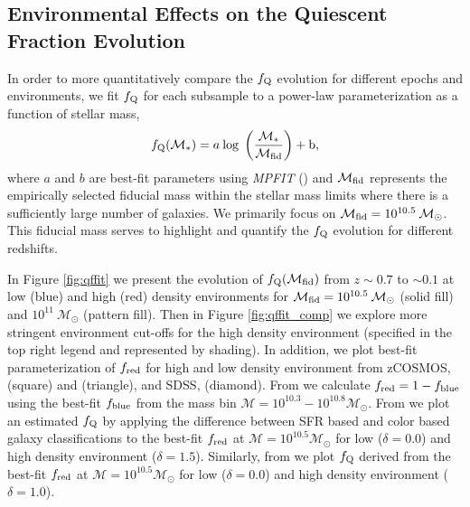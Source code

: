 \documentclass{emulateapj}
\begin{document}
\subsection{Environmental Effects on the Quiescent Fraction Evolution} \label{sec:env_qf_evol}
In order to more quantitatively compare the $f_{\rm{Q}}$ evolution for different epochs and environments, we fit $f_{\rm{Q}}$ for each subsample to a power-law parameterization as a function of stellar mass, 
\begin{equation} \label{eq:qffit}
f_{\rm{Q}}(\mathcal{M}_{*}) = a \: \rm{log} \; \left(\frac{ \mathcal{M}_{*}}{\mathcal{M}_{\rm{fid}}} \right)+b,
\end{equation}
where $a$ and $b$ are best-fit parameters using {\em MPFIT} (\cite{Markwardt:2009aa}) and $\mathcal{M}_{\rm{fid}}$ represents the empirically selected fiducial mass within the stellar mass limits where there is a sufficiently large number of galaxies. We primarily focus on $\mathcal{M}_{\rm{fid}} = 10^{10.5} \: \mathcal{M}_{\odot}$. This fiducial mass serves to highlight and quantify the $f_{\rm{Q}}$ evolution for different redshifts. 

In Figure \ref{fig:qffit} we present the evolution of $f_{\rm{Q}}(\mathcal{M}_{\rm{fid}})$ from $z \sim 0.7$ to $\sim 0.1$ at low (blue) and high (red) density environments for $\mathcal{M}_{\rm{fid}} = 10^{10.5} \: \mathcal{M}_{\odot}$ (solid fill) and $10^{11} \: \mathcal{M}_{\odot}$ (pattern fill). Then in Figure \ref{fig:qffit_comp} we explore more stringent environment cut-offs for the high density environment (specified in the top right legend and represented by shading). In addition, we plot best-fit parameterization of $f_{\rm{red}}$ for high and low density environment from zCOSMOS, \cite{Iovino:2010aa} (square) and \cite{Kovac:2014aa} (triangle), and SDSS, \cite{Baldry:2006aa} (diamond). From \cite{Iovino:2010aa} we calculate $f_{\rm{red}} = 1-f_{\rm{blue}}$ using the best-fit $f_{\rm{blue}}$ from the mass bin $\mathcal{M} = 10^{10.3} - 10^{10.8} \mathcal{M}_{\odot}$. From \cite{Kovac:2014aa} we plot an estimated $f_{\rm{Q}}$ by applying the difference between SFR based and color based galaxy classifications to the best-fit $f_{\rm{red}}$ at $\mathcal{M} = 10^{10.5} \mathcal{M}_{\odot}$ for low ($\delta = 0.0$) and high density environment ($\delta = 1.5$). Similarly, from \cite{Baldry:2006aa} we plot $f_{\rm{Q}}$ derived from the best-fit $f_{\rm{red}}$ at $\mathcal{M} = 10^{10.5} \mathcal{M}_{\odot}$ for low ($\delta = 0.0$) and high density environment ($\delta = 1.0$).
\end{document}
